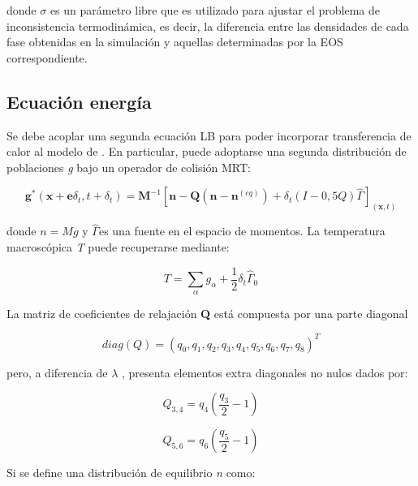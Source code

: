 donde $\sigma$ es un parámetro libre que es utilizado para ajustar el problema de inconsistencia termodinámica, es decir, la diferencia entre las densidades de cada fase obtenidas en la simulación y aquellas determinadas por la EOS correspondiente.

\subsection{Ecuación energía}

Se debe acoplar una segunda ecuación LB para poder incorporar transferencia de calor al modelo de \cite{li2013lattice}. En particular, puede adoptarse una segunda distribución de poblaciones \textit{g} bajo un operador de colisión MRT:

\begin{equation}
    \mathbf{g^*}(\mathbf{x} + \mathbf{e} \delta_{t} ,t + \delta_{t}) = \mathbf{M}^{-1} \left[ \mathbf{n} - \mathbf{Q}(\mathbf{n} - \mathbf{n}^{(eq)}) + \delta_{t} \left( I - 0,5 Q \right) \hat{\Gamma}  \right]_{(\mathbf{x},t)}
    \label{eq:fieldenergy}
\end{equation}

donde $n = M g$ y $\hat{\Gamma}$es una fuente en el espacio de momentos. La temperatura macroscópica \textit{T} puede recuperarse mediante:

\begin{equation}
    T = \sum_{\alpha} g_{\alpha} + \frac{1}{2} \delta_{t} {\hat{\Gamma}}_{0}
\end{equation}

La matriz de coeficientes de relajación \textbf{Q} está compuesta por una parte diagonal

\begin{equation}
    \textit{diag} (Q) = {( q_{0} , q_{1} , q_{2} , q_{3} , q_{4} , q_{5} , q_{6} , q_{7} , q_{8} )}^{T}
\end{equation}

pero, a diferencia de $\lambda$ , presenta elementos extra diagonales no nulos dados por:

\begin{equation}
    Q_{3,4} = q_{4} \left( \frac{q_{3}}{2} - 1 \right)
\end{equation}

\begin{equation}
    Q_{5,6} = q_{6} \left( \frac{q_{5}}{2} - 1 \right)
\end{equation}

Si se define una distribución de equilibrio \textit{n} como:

